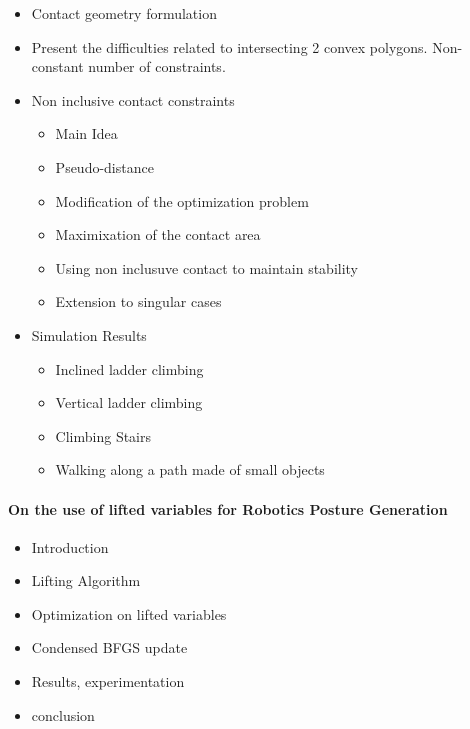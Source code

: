 \documentclass{article}
\begin{document}
\begin{itemize}
  \item Contact geometry formulation
  \item Present the difficulties related to intersecting 2 convex polygons. Non-constant number of constraints.

  \item{Non inclusive contact constraints}
    \begin{itemize}
      \item {Main Idea}
      \item {Pseudo-distance}
      \item {Modification of the optimization problem}
      \item {Maximixation of the contact area}
      \item {Using non inclusuve contact to maintain stability}
      \item {Extension to singular cases}
    \end{itemize}
  \item{Simulation Results}
     \begin{itemize}
      \item{Inclined ladder climbing}
      \item{Vertical ladder climbing}
      \item{Climbing Stairs}
      \item{Walking along a path made of small objects}
     \end{itemize}
\end{itemize}


\paragraph{On the use of lifted variables for Robotics Posture Generation}

\begin{itemize}
  \item {Introduction}
  \item {Lifting Algorithm}
  \item {Optimization on lifted variables}
  \item {Condensed BFGS update}
  \item {Results, experimentation}
  \item {conclusion}
\end{itemize}
\end{document}
